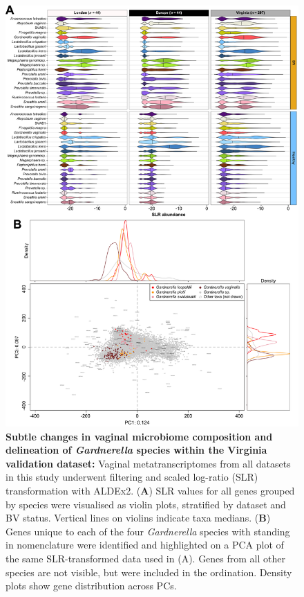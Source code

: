 \documentclass[sn-mathphys,Numbered]{sn-jnl}%
\begin{document}
\begin{figure}[H]
    \centering
    \includegraphics[scale=1.15]{0_multipanel_fig4.png}
    \caption{\textbf{Subtle changes in vaginal microbiome composition and delineation of \textit{Gardnerella} species within the Virginia validation dataset:} Vaginal metatranscriptomes from all datasets in this study underwent filtering and scaled log-ratio (SLR) transformation with ALDEx2. (\textbf{A}) SLR values for all genes grouped by species were visualised as violin plots, stratified by dataset and BV status. Vertical lines on violins indicate taxa medians. (\textbf{B}) Genes unique to each of the four \textit{Gardnerella} species with standing in nomenclature were identified and highlighted on a PCA plot of the same SLR-transformed data used in (A). Genes from all other species are not visible, but were included in the ordination. Density plots show gene distribution across PCs.}
    \label{fig:figViolinGardnerella}
\end{figure}
\end{document}
